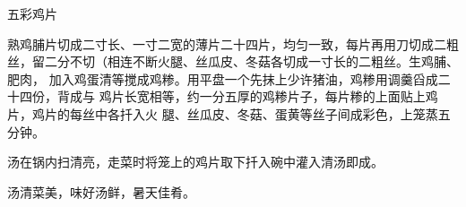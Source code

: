\begin{recipe}{五彩鸡片}

\ingredients


\preparation

\step 熟鸡脯片切成二寸长、一寸二宽的薄片二十四片，均匀一致，每片再用刀切成二粗
丝，留二分不切（相连不断火腿、丝瓜皮、冬菇各切成一寸长的二粗丝。生鸡脯、肥肉，
加入鸡蛋清等搅成鸡糁。用平盘一个先抹上少许猪油，鸡糁用调羹舀成二十四份，背成与
鸡片长宽相等，约一分五厚的鸡糁片子，每片糁的上面贴上鸡片，鸡片的每丝中各扦入火
腿、丝瓜皮、冬菇、蛋黄等丝子间成彩色，上笼蒸五分钟。

\step 汤在锅内扫清亮，走菜时将笼上的鸡片取下扦入碗中灌入清汤即成。

\features

汤清菜美，味好汤鲜，暑天佳肴。

\end{recipe}

